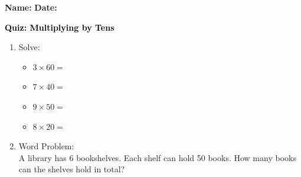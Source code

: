 \documentclass[12pt, letterpaper, fleqn]{article}
\newcommand{\blank}{\underline{\hspace{2.2cm}}}
\begin{document}
\textbf{Name:} \underline{\hspace{5cm}}
\hfill
\textbf{Date:} \underline{\hspace{3cm}}\\

\begin{tcolorbox}[colback=customteal!20]
    \large\textcolor{black}{\textbf{Quiz: Multiplying by Tens}}
\end{tcolorbox}

\vspace{5mm}
\begin{enumerate}[itemsep=2.5cm, leftmargin=0.6cm]
\item Solve:
  \begin{itemize}[itemsep=0.8cm]
    \item $3 \times 60 =$ \blank
    \item $7 \times 40 =$ \blank
    \item $9 \times 50 =$ \blank
    \item $8 \times 20 =$ \blank
  \end{itemize}

\item Word Problem:
\\
A library has 6 bookshelves. Each shelf can hold 50 books. How many books can the shelves hold in total?
\end{enumerate}
\end{document}
